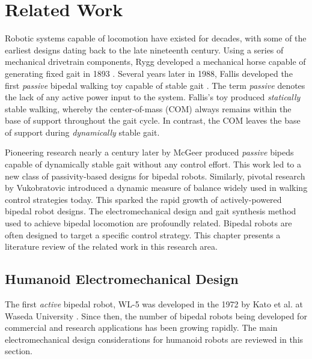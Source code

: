 \chapter{Related Work} %
\label{cha:background}
Robotic systems capable of locomotion have existed for decades, with some of the earliest designs dating back to the late nineteenth century. Using a series of mechanical drivetrain components, Rygg developed a mechanical horse capable of generating fixed gait in 1893 \cite{rygg1893mechanical}. Several years later in 1988, Fallis developed the first \emph{passive} bipedal walking toy capable of stable gait \cite{pallis1888fallis}. The term \emph{passive} denotes the lack of any active power input to the system. Fallis's toy produced \emph{statically} stable walking, whereby the center-of-mass (COM) always remains within the base of support throughout the gait cycle. In contrast, the COM leaves the base of support during \emph{dynamically} stable gait. 

Pioneering research nearly a century later by McGeer \cite{McGeer:1990uk} produced \emph{passive} bipeds capable of dynamically stable gait without any control effort. This work led to a new class of passivity-based designs for bipedal robots. Similarly, pivotal research by Vukobratovic \cite{vukobratovic1969} introduced a dynamic measure of balance widely used in walking control strategies today. This sparked the rapid growth of actively-powered bipedal robot designs. The electromechanical design and gait synthesis method used to achieve bipedal locomotion are profoundly related. Bipedal robots are often designed to target a specific control strategy. This chapter presents a literature review of the related work in this research area. 





\section{Humanoid Electromechanical Design} %
\label{sec:related_electromechanical_design}
The first \emph{active} bipedal robot, WL-5 was developed in the 1972 by Kato et al. at Waseda University \cite{kato1972hydraulically}. Since then, the number of bipedal robots being developed for commercial and research applications has been growing rapidly. The main electromechanical design considerations for humanoid robots are reviewed in this section. 


